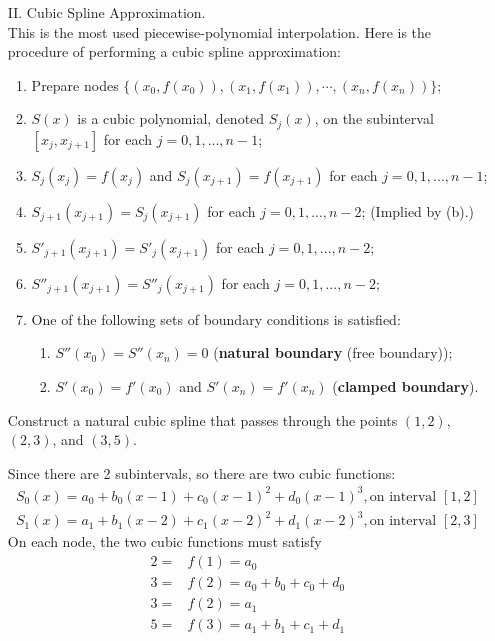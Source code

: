 \begin{enumerate}
	\item [II.]
	Cubic Spline Approximation.\\
	This is the most used piecewise-polynomial interpolation. Here is the procedure of performing a cubic spline approximation:
	\begin{enumerate}
		\item 
		Prepare nodes $\{ (x_0, f(x_0)), (x_1, f(x_1)),\cdots, (x_n, f(x_n))\}$;
		\item
		$S(x)$ is a cubic polynomial, denoted $S_j(x)$, on the subinterval $[x_j, x_{j+1}]$ for each $j = 0, 1,... , n-1$;
		\item 
		$S_j(x_j) = f(x_j)$ and $S_j(x_{j+1}) = f(x_{j+1})$ for each $j = 0, 1,... , n - 1$; 
		\item 
		$S_{j+1}(x_{j+1}) = S_j(x_{j+1})$ for each $j = 0, 1,... , n-2$; (Implied by (b).) 
		\item 
		$S'_{j+1}(x_{j+1}) = S'_j(x_{j+1})$ for each $j = 0, 1,... , n-2$;
		\item 
		$S''_{j+1}(x_{j+1}) = S''_j(x_{j+1})$ for each $j = 0, 1,... , n-2$;
		\item 
		One of the following sets of boundary conditions is satisfied:
		\begin{enumerate}
			\item
			$S''(x_0) = S''(x_n) = 0$ (\textbf{natural boundary} (free boundary));
			\item 
			$S'(x_0) = f'(x_0)$ and $S'(x_n) = f'(x_n)$ (\textbf{clamped boundary}).
		\end{enumerate}
	\end{enumerate} 

	\begin{ex}
		Construct a natural cubic spline that passes through the points $(1, 2)$, $(2, 3)$, and $(3, 5)$.
	\end{ex}
	\begin{solution}
		Since there are 2 subintervals, so there are two cubic functions:
		\begin{align*}
		S_0(x) = a_0 + b_0(x - 1) + c_0(x - 1)^2 + d_0(x - 1)^3,\text{on interval $[1,2]$}\\
		S_1(x) = a_1 + b_1(x - 2) + c_1(x - 2)^2 + d_1(x - 2)^3,\text{on interval $[2,3]$}
		\end{align*}
		On each node, the two cubic functions must satisfy
		\begin{align*}
		2 = &f(1) = a_0\\
		3 = &f(2) = a_0 + b_0 + c_0 + d_0\\
		3 = &f(2) = a_1\\
		5 = &f(3) = a_1 + b_1 + c_1 + d_1
		\end{align*}
		

\end{solution}
\end{enumerate}
